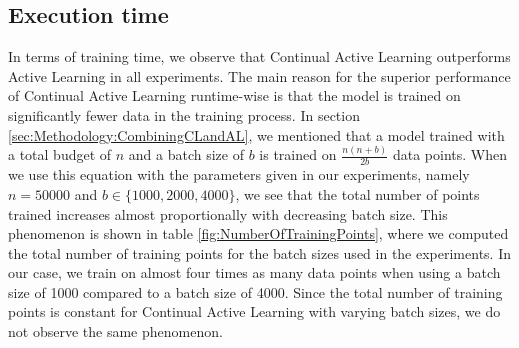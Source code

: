 \subsection{Execution time}
\label{sec:Discussion:ExecutionTime}
In terms of training time, we observe that Continual Active Learning outperforms Active Learning in all experiments. The main reason for the superior
performance of Continual Active Learning runtime-wise is that the model is trained on significantly fewer data in the training process. In section
\ref{sec:Methodology:CombiningCLandAL}, we mentioned that a model trained with a total budget of $n$ and a batch size of $b$ is trained on $\frac{n(n+b)}{2b}$
data points. When we use this equation with the parameters given in our experiments, namely $n=50000$ and $b \in \{ 1000, 2000, 4000\}$, we see that
the total number of points trained increases almost proportionally with decreasing batch size. This phenomenon is shown in table 
\ref{fig:NumberOfTrainingPoints}, where we computed the total number of training points for the batch sizes used in the experiments. In our case,
we train on almost four times as many data points when using a batch size of 1000 compared to a batch size of 4000. Since the total number of training
points is constant for Continual Active Learning with varying batch sizes, we do not observe the same phenomenon. \par


